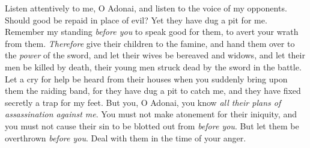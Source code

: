 \begin{biblechapter}
\verse Listen attentively to me, O Adonai, 
and listen to the voice of my opponents.
\verse Should good be repaid in place of evil? 
Yet they have dug a pit for me. 
Remember my standing \textit{before you} to speak good for them, 
to avert your wrath from them.
\verse \textit{Therefore} give their children to the famine, 
and hand them over to the \textit{power} of the sword, 
and let their wives be bereaved and widows, 
and let their men be killed by death, 
their young men struck dead 
by the sword in the battle.
\verse Let a cry for help be heard from their houses 
when you suddenly bring upon them the raiding band, 
for they have dug a pit to catch me, 
and they have fixed secretly a trap for my feet.
\verse But you, O Adonai, you know 
\textit{all their plans of assassination against me}. 
You must not make atonement for their iniquity, 
and you must not cause their sin to be blotted out from \textit{before you}. 
But let them be overthrown \textit{before you}. 
Deal with them in the time of your anger.
\end{biblechapter}

